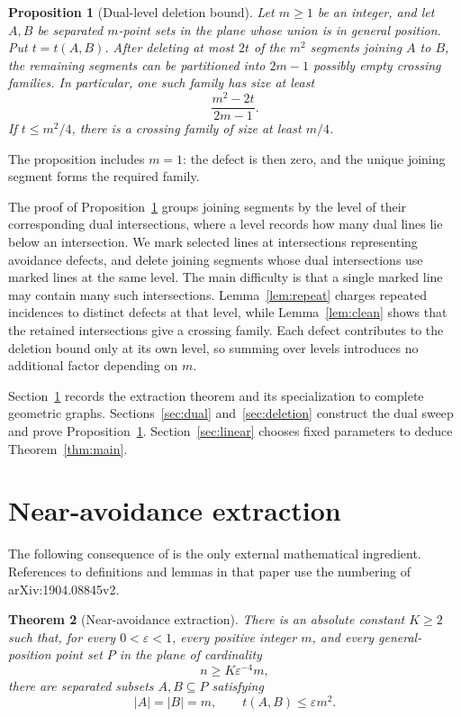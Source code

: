 \documentclass[12pt]{article}
\newtheorem{theorem}{Theorem}
\newtheorem{proposition}[theorem]{Proposition}
\begin{document}
\begin{proposition}[Dual-level deletion bound]\label{prop:key}
Let \(m\geq1\) be an integer, and let \(A,B\) be separated
\(m\)-point sets in the plane whose union is in general position.
Put \(t=t(A,B)\). After deleting at most \(2t\) of the \(m^2\)
segments joining \(A\) to \(B\), the remaining segments can be
partitioned into \(2m-1\) possibly empty crossing families.
In particular, one such family has size at least
\begin{equation}
 \frac{m^2-2t}{2m-1}.
 \label{eq:keybound}
\end{equation}
If \(t\leq m^2/4\), there is a crossing family of size at least \(m/4\).
\end{proposition}

The proposition includes \(m=1\): the defect is then zero, and the
unique joining segment forms the required family.

The proof of Proposition~\ref{prop:key} groups joining segments by
the level of their corresponding dual intersections, where a level
records how many dual lines lie below an intersection. We mark
selected lines at intersections representing avoidance defects,
and delete joining segments whose dual intersections use marked
lines at the same level. The main difficulty is that a single
marked line may contain many such intersections.
Lemma~\ref{lem:repeat} charges repeated incidences to distinct
defects at that level, while Lemma~\ref{lem:clean} shows that the
retained intersections give a crossing family. Each defect
contributes to the deletion bound only at its own level, so summing
over levels introduces no additional factor depending on \(m\).

Section~\ref{sec:extraction} records the extraction theorem and its
specialization to complete geometric graphs.
Sections~\ref{sec:dual} and~\ref{sec:deletion} construct the dual
sweep and prove Proposition~\ref{prop:key}.
Section~\ref{sec:linear} chooses fixed parameters to deduce
Theorem~\ref{thm:main}.

\section{Near-avoidance extraction}\label{sec:extraction}

The following consequence of \cite[Lemma~3.3]{PRT2021} is the only
external mathematical ingredient. References to definitions and
lemmas in that paper use the numbering of arXiv:1904.08845v2.

\begin{theorem}[Near-avoidance extraction]\label{thm:extraction}
There is an absolute constant \(K\geq2\) such that, for every
\(0<\varepsilon<1\), every positive integer \(m\), and every
general-position point set \(P\) in the plane of cardinality
\[
 n\geq K\varepsilon^{-4}m,
\]
there are separated subsets \(A,B\subseteq P\) satisfying
\[
 |A|=|B|=m,
 \qquad
 t(A,B)\leq\varepsilon m^2.
\]
\end{theorem}
\end{document}
